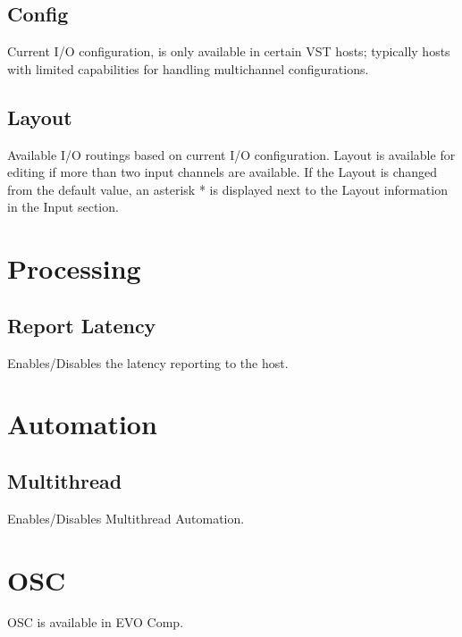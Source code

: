 \documentclass[
  letterpaper,
  DIV=11,
  numbers=noendperiod]{scrreport}
\begin{document}
\hypertarget{config}{%
\subsection{Config}\label{config}}

Current I/O configuration, is only available in certain VST hosts;
typically hosts with limited capabilities for handling multichannel
configurations.

\hypertarget{layout}{%
\subsection{Layout}\label{layout}}

Available I/O routings based on current I/O configuration. Layout is
available for editing if more than two input channels are available. If
the Layout is changed from the default value, an asterisk * is displayed
next to the Layout information in the Input section.

\hypertarget{processing}{%
\section{Processing}\label{processing}}

\hypertarget{report-latency}{%
\subsection{Report Latency}\label{report-latency}}

Enables/Disables the latency reporting to the host.

\hypertarget{automation}{%
\section{Automation}\label{automation}}

\hypertarget{multithread}{%
\subsection{Multithread}\label{multithread}}

Enables/Disables Multithread Automation.

\hypertarget{osc}{%
\section{OSC}\label{osc}}

OSC is available in EVO Comp.
\end{document}
